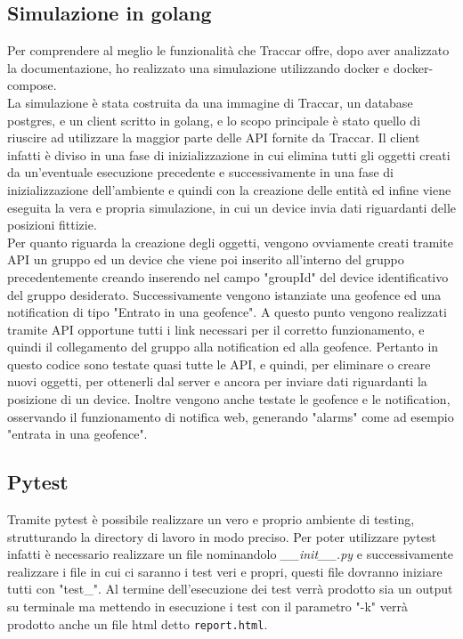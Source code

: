 \documentclass[a4paper,titlepage,12pt]{report}
\begin{document}
{\subsection{
Simulazione in golang}
Per comprendere al meglio le funzionalità che Traccar offre, dopo aver analizzato la documentazione, ho realizzato una simulazione utilizzando docker e docker-compose.\\
La simulazione è stata costruita da una immagine di Traccar, un database postgres, e un client scritto in golang, e lo scopo principale è stato quello di riuscire ad utilizzare la maggior parte delle API fornite da Traccar. Il client infatti è diviso in una fase di inizializzazione in cui elimina tutti gli oggetti creati da un'eventuale esecuzione precedente e successivamente in una fase di inizializzazione dell'ambiente e quindi con la creazione delle entità ed infine viene eseguita la vera e propria simulazione, in cui un device invia dati riguardanti delle posizioni fittizie.\\
Per quanto riguarda la creazione degli oggetti, vengono ovviamente creati tramite API un gruppo ed un device che viene poi inserito all'interno del gruppo precedentemente creando inserendo nel campo "groupId" del device identificativo del gruppo desiderato. Successivamente vengono istanziate una geofence ed una notification di tipo "Entrato in una geofence". A questo punto vengono realizzati tramite API opportune tutti i link necessari per il corretto funzionamento, e quindi il collegamento del gruppo alla notification ed alla geofence.
Pertanto in questo codice sono testate quasi tutte le API, e quindi, per eliminare o creare nuovi oggetti, per ottenerli dal server e ancora per inviare dati riguardanti la posizione di un device. Inoltre vengono anche testate le geofence e le notification, osservando il funzionamento di notifica web, generando "alarms" come ad esempio "entrata in una geofence".


\subsection{
Pytest}
Tramite pytest è possibile realizzare un vero e proprio ambiente di testing, strutturando la directory di lavoro in modo preciso. Per poter utilizzare pytest infatti è necessario realizzare un file nominandolo \textit{\_\_init\_\_.py} e successivamente realizzare i file in cui ci saranno i test veri e propri, questi file dovranno iniziare tutti con "test\_". Al termine dell'esecuzione dei test verrà prodotto sia un output su terminale ma mettendo in esecuzione i test con il parametro "-k" verrà prodotto anche un file html detto \texttt{report.html}.
 
}
\end{document}
